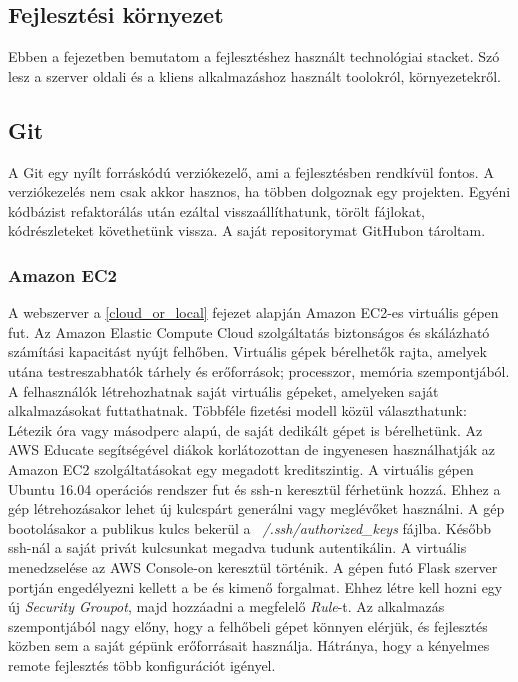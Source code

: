 \subsection{Fejlesztési környezet}

Ebben a fejezetben bemutatom a fejlesztéshez használt technológiai stacket. Szó lesz a szerver oldali és a kliens alkalmazáshoz használt toolokról, környezetekről.

\subsection{Git}

A Git egy nyílt forráskódú verziókezelő, ami a fejlesztésben rendkívül fontos. A verziókezelés nem csak akkor hasznos, ha többen dolgoznak egy projekten. Egyéni kódbázist
refaktorálás után ezáltal visszaállíthatunk, törölt fájlokat, kódrészleteket követhetünk vissza. A saját repositorymat GitHubon tároltam.

\subsubsection{Amazon EC2}

A webszerver a \ref{cloud_or_local} fejezet alapján Amazon EC2-es virtuális gépen fut. Az Amazon Elastic Compute Cloud szolgáltatás biztonságos és skálázható számítási kapacitást nyújt felhőben. Virtuális gépek bérelhetők rajta, amelyek utána testreszabhatók tárhely és erőforrások; processzor, memória szempontjából.
\newline
\newline
A felhasználók létrehozhatnak saját virtuális gépeket, amelyeken saját alkalmazásokat futtathatnak. Többféle fizetési modell közül választhatunk: Létezik óra vagy másodperc alapú, de saját dedikált gépet is bérelhetünk. Az AWS Educate segítségével diákok korlátozottan de ingyenesen használhatják az Amazon EC2 szolgáltatásokat egy megadott kreditszintig.
\newline
\newline
A virtuális gépen Ubuntu 16.04 operációs rendszer fut és ssh-n keresztül férhetünk hozzá. Ehhez a gép létrehozásakor lehet új kulcspárt generálni vagy meglévőket használni. A gép bootolásakor a publikus kulcs bekerül a \emph{~/.ssh/authorized\_keys} fájlba. Később ssh-nál a saját privát kulcsunkat megadva tudunk autentikálin. A virtuális menedzselése az AWS Console-on keresztül történik. A gépen futó Flask szerver portján engedélyezni kellett a be és kimenő forgalmat. Ehhez létre kell hozni egy új \emph{Security Groupot}, majd hozzáadni a megfelelő \emph{Rule}-t.
\newline
\newline
Az alkalmazás szempontjából nagy előny, hogy a felhőbeli gépet könnyen elérjük, és fejlesztés közben sem a saját gépünk erőforrásait használja. Hátránya, hogy a kényelmes remote fejlesztés több konfigurációt igényel.

